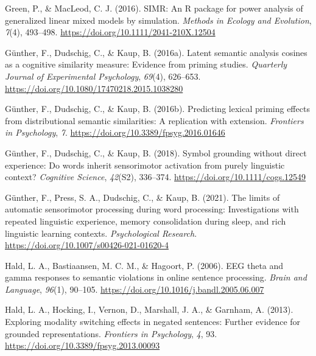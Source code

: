 \documentclass[
  12pt,
  man,floatsintext]{apa7}
\newlength{\cslhangindent}
\newlength{\cslentryspacingunit} %
\newenvironment{CSLReferences}[2] %
 {%
  \setlength{\parindent}{0pt}
  \ifodd #1
  \let\oldpar\par
  \def\par{\hangindent=\cslhangindent\oldpar}
  \fi
  \setlength{\parskip}{#2\cslentryspacingunit}
 }%
 {}
\begin{document}
\begin{CSLReferences}{1}{0}
\leavevmode{}%
Green, P., \& MacLeod, C. J. (2016). {SIMR}: {An R} package for power analysis of generalized linear mixed models by simulation. \emph{Methods in Ecology and Evolution}, \emph{7}(4), 493--498. \url{https://doi.org/10.1111/2041-210X.12504}

\leavevmode{}%
Günther, F., Dudschig, C., \& Kaup, B. (2016a). Latent semantic analysis cosines as a cognitive similarity measure: {Evidence} from priming studies. \emph{Quarterly Journal of Experimental Psychology}, \emph{69}(4), 626--653. \url{https://doi.org/10.1080/17470218.2015.1038280}

\leavevmode{}%
Günther, F., Dudschig, C., \& Kaup, B. (2016b). Predicting lexical priming effects from distributional semantic similarities: {A} replication with extension. \emph{Frontiers in Psychology}, \emph{7}. \url{https://doi.org/10.3389/fpsyg.2016.01646}

\leavevmode{}%
Günther, F., Dudschig, C., \& Kaup, B. (2018). Symbol grounding without direct experience: Do words inherit sensorimotor activation from purely linguistic context? \emph{Cognitive Science}, \emph{42}(S2), 336--374. \url{https://doi.org/10.1111/cogs.12549}

\leavevmode{}%
Günther, F., Press, S. A., Dudschig, C., \& Kaup, B. (2021). The limits of automatic sensorimotor processing during word processing: Investigations with repeated linguistic experience, memory consolidation during sleep, and rich linguistic learning contexts. \emph{Psychological Research}. \url{https://doi.org/10.1007/s00426-021-01620-4}

\leavevmode{}%
Hald, L. A., Bastiaansen, M. C. M., \& Hagoort, P. (2006). {EEG} theta and gamma responses to semantic violations in online sentence processing. \emph{Brain and Language}, \emph{96}(1), 90--105. \url{https://doi.org/10.1016/j.bandl.2005.06.007}

\leavevmode{}%
Hald, L. A., Hocking, I., Vernon, D., Marshall, J. A., \& Garnham, A. (2013). Exploring modality switching effects in negated sentences: {Further} evidence for grounded representations. \emph{Frontiers in Psychology}, \emph{4}, 93. \url{https://doi.org/10.3389/fpsyg.2013.00093}


\end{CSLReferences}
\end{document}
